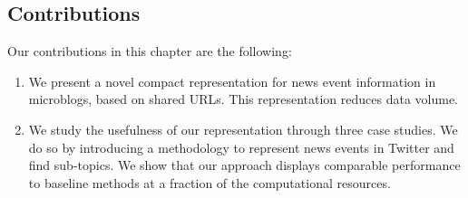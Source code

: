 \subsection{Contributions}

Our contributions in this chapter are the following:

\begin{enumerate}
  \item We present a novel compact representation for news event information in
  microblogs, based on shared URLs. This representation reduces data volume.

  \item We study the usefulness of our representation through three case
  studies. We do so by introducing a methodology to represent news events in
  Twitter and find sub-topics. We show that our approach displays comparable
  performance to baseline methods at a fraction of the computational resources.
\end{enumerate}




